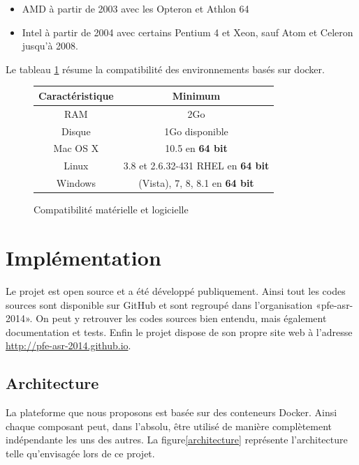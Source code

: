 \documentclass[a4paper,11pt]{report}
\begin{document}
\begin{itemize}
  \item AMD à partir de 2003 avec les Opteron et Athlon 64
  \item Intel à partir de 2004 avec certains Pentium 4 et Xeon, sauf Atom et Celeron jusqu'à 2008.
\end{itemize}

Le tableau \ref{compat} résume la compatibilité des environnements basés sur docker.

   \begin{figure}[h!]
\begin{center}
   \begin{tabular}{| c | c |}
     \hline
     Caractéristique & Minimum \\ \hline
     RAM & 2Go \\ \hline
     Disque & 1Go disponible \\ \hline
     Mac OS X & 10.5 en \textbf{64 bit} \\ \hline
     Linux & 3.8 et 2.6.32-431 RHEL en \textbf{64 bit} \\ \hline
     Windows & (Vista), 7, 8, 8.1 en \textbf{64 bit} \\
     \hline
   \end{tabular}
   \end{center}
   \caption{Compatibilité matérielle et logicielle}
   \label{compat}
  
\end{figure}

\chapter{Implémentation}
\thispagestyle{fancy}
Le projet est open source et a été développé publiquement. Ainsi tout les codes sources sont disponible sur GitHub et sont regroupé dans l'organisation «pfe-asr-2014». On peut y retrouver les codes sources bien entendu, mais également documentation et tests. Enfin le projet dispose de son propre site web à l'adresse \url{http://pfe-asr-2014.github.io}.

\section{Architecture}

La plateforme que nous proposons est basée sur des conteneurs Docker. Ainsi chaque composant peut, dans l'absolu, être utilisé de manière
complètement indépendante les uns des autres. La figure\ref{architecture} représente l'architecture telle qu'envisagée lors de ce projet.
\end{document}
